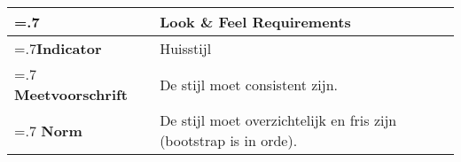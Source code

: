 \noindent
\begin{longtable}{|>{\raggedleft\hsize=.7\hsize\bfseries}X|
    >{\arraybackslash\hsize=1.3\hsize}X|} \hline
\multicolumn{1}{|l|}{\textbf{NFR}} & Look \& Feel Requirements\\ \hline
Indicator & Huisstijl \\  \hline
Meetvoorschrift & De stijl moet consistent zijn.\\ \hline
Norm &  De stijl moet overzichtelijk en fris zijn (bootstrap is in orde).\\ \hline
\end{longtable}